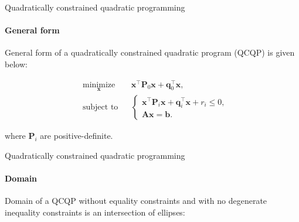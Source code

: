 \documentclass{beamer}
\begin{document}
\begin{frame}{Quadratically constrained quadratic programming}
\framesubtitle{General form}
\begin{flushleft}

General form of a quadratically constrained quadratic program (QCQP) is given below:

%
\begin{equation}
\begin{aligned}
& \underset{\mathbf{x}}{\text{minimize}}
& & \mathbf{x}^\top \mathbf{P}_0 \mathbf{x} + \mathbf{q}_0^\top\mathbf{x}, \\
& \text{subject to}
& & \begin{cases}
    \mathbf{x}^\top \mathbf{P}_i \mathbf{x} + \mathbf{q}_i^\top\mathbf{x} + r_i \leq 0, \\
    \mathbf{A}\mathbf{x} = \mathbf{b}.
    \end{cases}
\end{aligned}
\end{equation}

where $\mathbf{P}_i$ are positive-definite.
 
\end{flushleft}
\end{frame}



\begin{frame}{Quadratically constrained quadratic programming}
\framesubtitle{Domain}
\begin{flushleft}

Domain of a QCQP without equality constraints and with no degenerate inequality constraints is an intersection of ellipses:

\begin{figure} [h!]
\begin{center}

\end{center} 
\end{figure}
 
\end{flushleft}
\end{frame}
\end{document}
